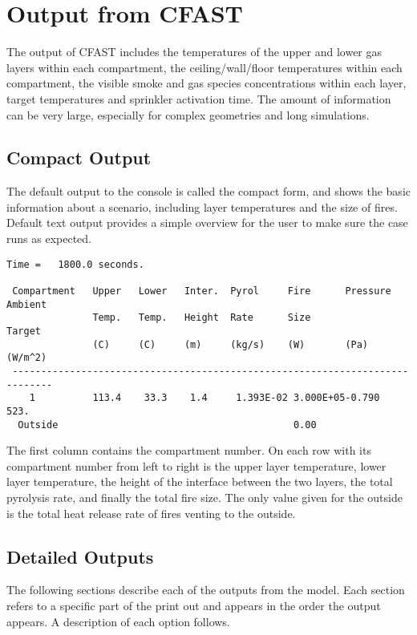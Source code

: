 \chapter{Output from CFAST}
\label{Output_Chapter}

The output of CFAST includes the temperatures of the upper and lower gas layers within each compartment, the ceiling/wall/floor temperatures within each compartment, the visible smoke and gas species concentrations within each layer, target temperatures and sprinkler activation time.  The amount of information can be very large, especially for complex geometries and long simulations.

\section{Compact Output}

The default output to the console is called the compact form, and shows the basic information about a scenario, including layer temperatures and the size of fires. Default text output provides a simple overview for the user to make sure the case runs as expected.
\begin{lstlisting}[basicstyle=\scriptsize]
 Time =   1800.0 seconds.

 Compartment   Upper   Lower   Inter.  Pyrol     Fire      Pressure  Ambient
               Temp.   Temp.   Height  Rate      Size                Target
               (C)     (C)     (m)     (kg/s)    (W)       (Pa)      (W/m^2)
 -----------------------------------------------------------------------------
    1          113.4    33.3    1.4     1.393E-02 3.000E+05-0.790      523.
  Outside                                         0.00
\end{lstlisting}
The first column contains the compartment number.  On each row with its compartment number from left to right is the upper layer temperature, lower layer temperature, the height of the interface between the two layers, the total pyrolysis rate, and finally the total fire size.  The only value given for the outside is the total heat release rate of fires venting to the outside.

\section{Detailed Outputs}

The following sections describe each of the outputs from the model.  Each section refers to a specific part of the print out and appears in the order the output appears. A description of each option follows.

